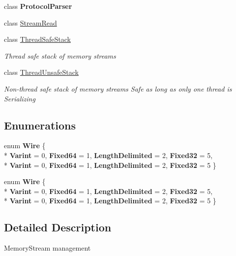 \begin{DoxyCompactItemize}
class {\bfseries Protocol\+Parser}
\item 
class \hyperlink{class_silent_orbit_1_1_protocol_buffers_1_1_stream_read}{Stream\+Read}
\item 
class \hyperlink{class_silent_orbit_1_1_protocol_buffers_1_1_thread_safe_stack}{Thread\+Safe\+Stack}
\begin{DoxyCompactList}\small\item\em Thread safe stack of memory streams \end{DoxyCompactList}\item 
class \hyperlink{class_silent_orbit_1_1_protocol_buffers_1_1_thread_unsafe_stack}{Thread\+Unsafe\+Stack}
\begin{DoxyCompactList}\small\item\em Non-\/thread safe stack of memory streams Safe as long as only one thread is Serializing \end{DoxyCompactList}\end{DoxyCompactItemize}
\subsection*{Enumerations}
\begin{DoxyCompactItemize}
\item 
\hypertarget{namespace_silent_orbit_1_1_protocol_buffers_a028c6c6bce285110df2b8d94c97b6862}{}enum {\bfseries Wire} \{ \\*
{\bfseries Varint} = 0, 
{\bfseries Fixed64} = 1, 
{\bfseries Length\+Delimited} = 2, 
{\bfseries Fixed32} = 5, 
\\*
{\bfseries Varint} = 0, 
{\bfseries Fixed64} = 1, 
{\bfseries Length\+Delimited} = 2, 
{\bfseries Fixed32} = 5
 \}\label{namespace_silent_orbit_1_1_protocol_buffers_a028c6c6bce285110df2b8d94c97b6862}

\item 
\hypertarget{namespace_silent_orbit_1_1_protocol_buffers_a028c6c6bce285110df2b8d94c97b6862}{}enum {\bfseries Wire} \{ \\*
{\bfseries Varint} = 0, 
{\bfseries Fixed64} = 1, 
{\bfseries Length\+Delimited} = 2, 
{\bfseries Fixed32} = 5, 
\\*
{\bfseries Varint} = 0, 
{\bfseries Fixed64} = 1, 
{\bfseries Length\+Delimited} = 2, 
{\bfseries Fixed32} = 5
 \}\label{namespace_silent_orbit_1_1_protocol_buffers_a028c6c6bce285110df2b8d94c97b6862}

\end{DoxyCompactItemize}


\subsection{Detailed Description}
Memory\+Stream management 

